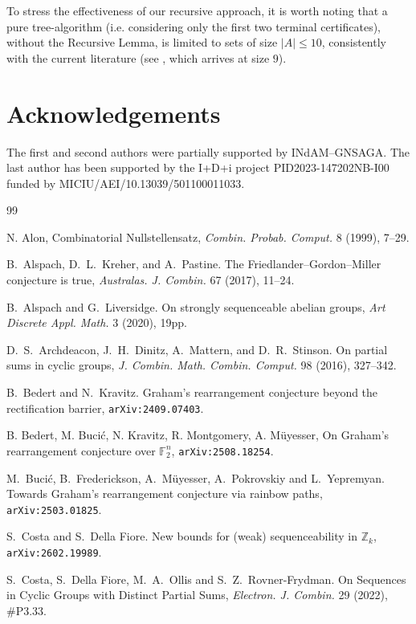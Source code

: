 \documentclass[11pt]{amsart}
\theoremstyle{definition}
\begin{document}
To stress the effectiveness of our recursive approach, it is worth noting that a pure tree-algorithm (i.e. considering only the first two terminal certificates), without the Recursive Lemma, is limited to sets of size $|A| \leq 10$, consistently with the current literature (see \cite{AL20}, which arrives at size $9$).

\section*{Acknowledgements}
The first and second authors were partially supported by INdAM--GNSAGA. The last author has been supported by the I+D+i project PID2023-147202NB-I00 funded by MICIU/AEI/10.13039/501100011033.

\nocite{*}
\begin{thebibliography}{99}
\small

 N. Alon, 
Combinatorial Nullstellensatz,
\textit{Combin. Probab. Comput.} 8 (1999), 7--29. 


B.~Alspach, D.~L.~Kreher, and A.~Pastine.
The Friedlander--Gordon--Miller conjecture is true,
{\em Australas. J. Combin.} 67 (2017), 11--24.

B.~Alspach and G.~Liversidge.
On strongly sequenceable abelian groups,
{\em Art Discrete Appl. Math.} 3 (2020), 19pp.

D.~S.~Archdeacon, J.~H.~Dinitz, A.~Mattern, and D.~R.~Stinson.
On partial sums in cyclic groups,
{\em J. Combin. Math. Combin. Comput.} 98 (2016), 327--342.

B.~Bedert and N.~Kravitz.
Graham's rearrangement conjecture beyond the rectification barrier,
\texttt{arXiv:2409.07403}.

B. Bedert, M. Bucić, N. Kravitz, R. Montgomery, A. Müyesser, On Graham's rearrangement conjecture over $\mathbb {F} _2^ n$, \texttt{arXiv:2508.18254}.

M.~Buci\'c, B.~Frederickson, A.~M\"uyesser, A.~Pokrovskiy and L.~Yepremyan.
Towards Graham's rearrangement conjecture via rainbow paths,
\texttt{arXiv:2503.01825}.

 S.~Costa and S.~Della Fiore. New bounds for (weak) sequenceability in $\mathbb{Z}_k$, \texttt{arXiv:2602.19989}.


S.~Costa, S.~Della Fiore, M.~A.~Ollis and S.~Z.~Rovner-Frydman.
On Sequences in Cyclic Groups with Distinct Partial Sums,
{\em Electron. J. Combin.} 29 (2022), \#P3.33.


\end{thebibliography}
\end{document}
